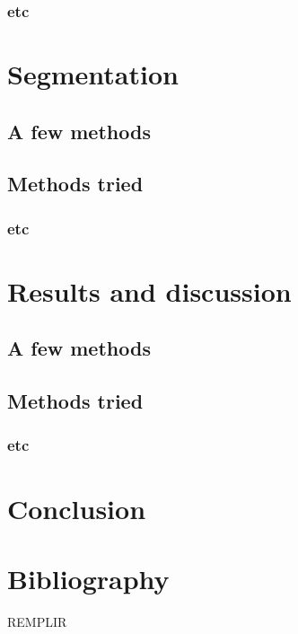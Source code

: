 \documentclass{report}
\begin{document}
\subsection{etc}

\chapter{Segmentation}
\section{A few methods}
\section{Methods tried}
\subsection{etc}

\chapter{Results and discussion}
\section{A few methods}
\section{Methods tried}
\subsection{etc}

\chapter{Conclusion}

\chapter{Bibliography}
REMPLIR
\end{document}
